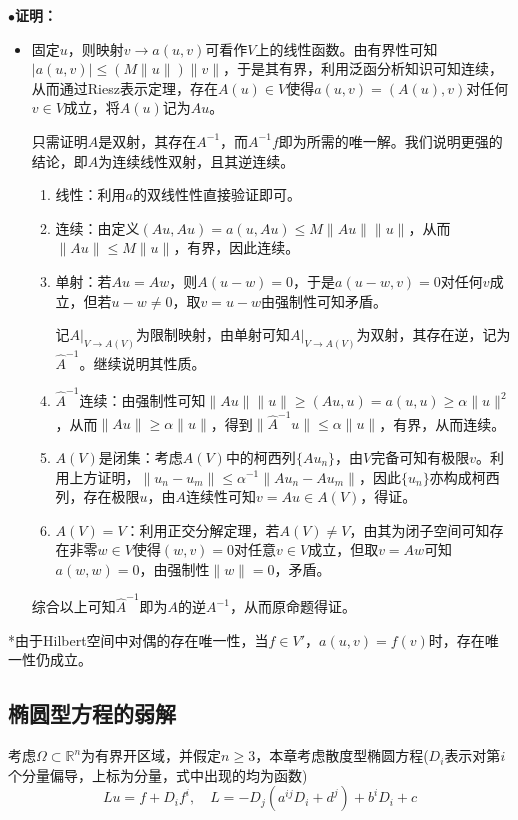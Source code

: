 \documentclass[a4paper,UTF8,fontset=windows,AutoFakeBold]{ctexart}
\newcommand{\proo}[1]{{\kaishu $\bullet$\textbf{证明：}
\begin{itemize}
    \item[] #1
\end{itemize}
}}
\begin{document}
\proo{
    固定$u$，则映射$v\to a(u,v)$可看作$V$上的线性函数。由有界性可知$|a(u,v)|\le(M\|u\|)\|v\|$，于是其有界，利用泛函分析知识可知连续，从而通过Riesz表示定理，存在$A(u)\in V$使得$a(u,v)=(A(u),v)$对任何$v\in V$成立，将$A(u)$记为$Au$。

    只需证明$A$是双射，其存在$A^{-1}$，而$A^{-1}f$即为所需的唯一解。我们说明更强的结论，即$A$为连续线性双射，且其逆连续。
    \begin{enumerate}
        \item 线性：利用$a$的双线性性直接验证即可。

        \item 连续：由定义$(Au,Au)=a(u,Au)\le M\|Au\|\|u\|$，从而$\|Au\|\le M\|u\|$，有界，因此连续。

        \item 单射：若$Au=Aw$，则$A(u-w)=0$，于是$a(u-w,v)=0$对任何$v$成立，但若$u-w\ne 0$，取$v=u-w$由强制性可知矛盾。

        记$A\big|_{V\to A(V)}$为限制映射，由单射可知$A\big|_{V\to A(V)}$为双射，其存在逆，记为$\hat{A}^{-1}$。继续说明其性质。
    
        \item $\hat{A}^{-1}$连续：由强制性可知$\|Au\|\|u\|\ge(Au,u)=a(u,u)\ge\alpha\|u\|^2$，从而$\|Au\|\ge\alpha\|u\|$，得到$\|\hat{A}^{-1}u\|\le\alpha\|u\|$，有界，从而连续。

        \item $A(V)$是闭集：考虑$A(V)$中的柯西列$\{Au_n\}$，由$V$完备可知有极限$v$。利用上方证明，$\|u_n-u_m\|\le\alpha^{-1}\|Au_n-Au_m\|$，因此$\{u_n\}$亦构成柯西列，存在极限$u$，由$A$连续性可知$v=Au\in A(V)$，得证。

        \item $A(V)=V$：利用正交分解定理，若$A(V)\ne V$，由其为闭子空间可知存在非零$w\in V$使得$(w,v)=0$对任意$v\in V$成立，但取$v=Aw$可知$a(w,w)=0$，由强制性$\|w\|=0$，矛盾。
    \end{enumerate}

    综合以上可知$\hat{A}^{-1}$即为$A$的逆$A^{-1}$，从而原命题得证。
}

*由于Hilbert空间中对偶的存在唯一性，当$f\in V'$，$a(u,v)=f(v)$时，存在唯一性仍成立。

\subsection{椭圆型方程的弱解}
考虑$\Omega\subset\mathbb{R}^n$为有界开区域，并假定$n\ge3$，本章考虑散度型椭圆方程($D_i$表示对第$i$个分量偏导，上标为分量，式中出现的均为函数)
$$Lu=f+D_if^i,\quad L=-D_j(a^{ij}D_i+d^j)+b^iD_i+c$$
\end{document}
